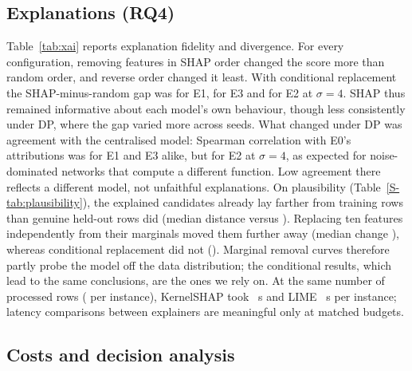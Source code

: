 \documentclass[11pt,a4paper]{article}
\begin{document}
\subsection{Explanations (RQ4)}

Table~\ref{tab:xai} reports explanation fidelity and divergence. For every configuration, removing features in SHAP order changed the score more than random order, and reverse order changed it least. With conditional replacement the SHAP-minus-random gap was  for E1,  for E3 and  for E2 at $\sigma=4$. SHAP thus remained informative about each model's own behaviour, though less consistently under DP, where the gap varied more across seeds. What changed under DP was agreement with the centralised model: Spearman correlation with E0's attributions was  for E1 and E3 alike, but  for E2 at $\sigma=4$, as expected for noise-dominated networks that compute a different function. Low agreement there reflects a different model, not unfaithful explanations. On plausibility (Table~\ref{S-tab:plausibility}), the explained candidates already lay farther from training rows than genuine held-out rows did (median distance  versus ). Replacing ten features independently from their marginals moved them further away (median change ), whereas conditional replacement did not (). Marginal removal curves therefore partly probe the model off the data distribution; the conditional results, which lead to the same conclusions, are the ones we rely on. At the same number of processed rows ( per instance), KernelSHAP took ~s and LIME ~s per instance; latency comparisons between explainers are meaningful only at matched budgets.



\subsection{Costs and decision analysis}
\end{document}
